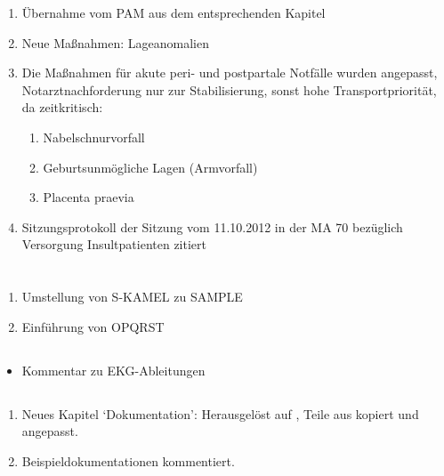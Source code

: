 \documentclass[
ngerman,
paper=a4,
asymmetric,
fontsize=10pt,
headings=small,
draft=false,
numbers=noenddot,
bibtotocnumbered,
footnotes=multiple,
toc=flat,
]{scrreprt}
\begin{document}
\begin{enumerate}
  \item Übernahme vom PAM aus dem entsprechenden Kapitel
  \item Neue Maßnahmen: Lageanomalien
  \item Die Maßnahmen für akute peri- und postpartale Notfälle
  wurden angepasst, Notarztnachforderung nur zur
  Stabilisierung, sonst hohe Transportpriorität, da
  zeitkritisch:
  \begin{enumerate}
    \item Nabelschnurvorfall
    \item Geburtsunmögliche Lagen (Armvorfall)
    \item Placenta praevia
  \end{enumerate}
  \item Sitzungsprotokoll der Sitzung vom 11.10.2012 in der MA
  70 bezüglich Versorgung Insultpatienten zitiert
\end{enumerate}

\chapter{\AASS}

\section{\CO{[AUP]}}
  \begin{enumerate}
    \item Umstellung von S-KAMEL zu SAMPLE
    \item Einführung von OPQRST
  \end{enumerate}
\section{\CO{[BAU]}}
  \begin{itemize}
    \item Kommentar zu EKG-Ableitungen
  \end{itemize}
\section{\CO{[DOK]}}
  \begin{enumerate}
    \item Neues Kapitel \enquote*{Dokumentation}:
    Herausgelöst auf \CO{[EIN]}, Teile aus \CO{[JUS]}
    kopiert und angepasst.
    \item Beispieldokumentationen kommentiert.
  \end{enumerate}
\end{document}
